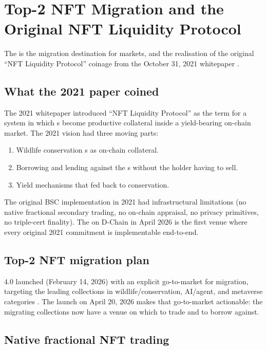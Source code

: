\section{Top-2 NFT Migration and the Original NFT Liquidity Protocol}
\label{sec:nft-migration}

The \Zoo{} \DEX{} is the migration destination for \NFT{} markets,
and the realisation of the original ``NFT Liquidity Protocol''
coinage from the October 31, 2021 \Zoo{} whitepaper \cite{zoo-2021}.

\subsection{What the 2021 paper coined}

The 2021 \Zoo{} whitepaper introduced ``NFT Liquidity Protocol'' as
the term for a system in which \NFT{}s become productive collateral
inside a yield-bearing on-chain market. The 2021 vision had three
moving parts:

\begin{enumerate}[leftmargin=1.4em]
  \item Wildlife conservation \NFT{}s as on-chain collateral.
  \item Borrowing and lending against the \NFT{}s without the
        holder having to sell.
  \item Yield mechanisms that fed back to conservation.
\end{enumerate}

The original BSC implementation in 2021 had infrastructural
limitations (no native fractional secondary trading, no on-chain
appraisal, no privacy primitives, no triple-cert finality). The
\Zoo{} \DEX{} on \Zoo{} D-Chain in April 2026 is the first venue
where every original 2021 commitment is implementable end-to-end.

\subsection{Top-2 NFT migration plan}

\Zoo{} 4.0 launched (February 14, 2026) with an explicit go-to-market
for \NFT{} migration, targeting the leading \NFT{} collections in
wildlife/conservation, AI/agent, and metaverse categories
\cite{zoo-4-0}. The \Zoo{} \DEX{} launch on April 20, 2026 makes that
go-to-market actionable: the migrating collections now have a venue
on which to trade and to borrow against.

\subsection{Native fractional NFT trading}

